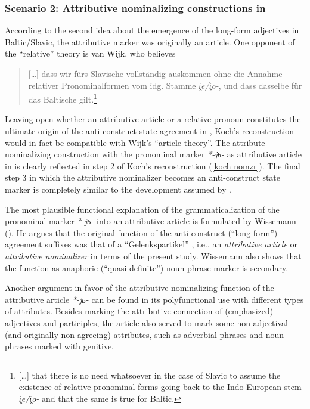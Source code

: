 \subsubsection{Scenario 2: Attributive nominalizing constructions in } 
According to the second idea about the emergence of the long-form adjectives in Baltic\slash{}Slavic, the attributive marker was originally an article. One opponent of the “relative” theory is van Wijk, who believes 
\begin{quote}
[\dots] dass wir fürs Slavische vollständig auskommen ohne die Annahme relativer Pronominalformen vom idg. Stamme \textit{i̭e/i̭o-}, und dass dasselbe für das Baltische gilt.\footnote{[\dots] that there is no need whatsoever in the case of Slavic to assume the existence of relative pronominal forms going back to the Indo-European stem \textit{i̭e/i̭o-} and that the same is true for Baltic.} \citep[28]{wijk1935}
\end{quote}

Leaving open whether an attributive article or a relative pronoun constitutes the ultimate origin of the anti\hyp{}construct state agreement in , Koch's reconstruction would in fact be compatible with Wijk's “article theory”. The attribute nominalizing construction with the pronominal marker \textit{*-jь-} as attributive article in  is clearly reflected in step 2 of Koch's reconstruction (\ref{koch nomzr}). The final step 3 in which the attributive nominalizer becomes an anti\hyp{}construct state marker is completely similar to the development assumed by \citet{wijk1935}.

The most plausible functional explanation of the grammaticalization of the pronominal marker \textit{*-jь-} into an attributive article is formulated by Wissemann (\citeyear{wissemann1958}). He argues that the original function of the anti\hyp{}construct (“long-form”) agreement suffixes was that of a “Gelenkspartikel” \citep[76]{wissemann1958}, i.e., an \textit{attributive article} or \textit{attributive nominalizer} in terms of the present study. Wissemann also shows that the function as anaphoric (“quasi-definite”) noun phrase marker is secondary.

Another argument in favor of the attributive nominalizing function of the  attributive article \textit{*-jь-} can be found in its polyfunctional use with different types of attributes. Besides marking the attributive connection of (emphasized) adjectives and participles, the article also served to mark some non-adjectival (and originally non-agreeing) attributes, such as adverbial phrases and noun phrases marked with genitive.

